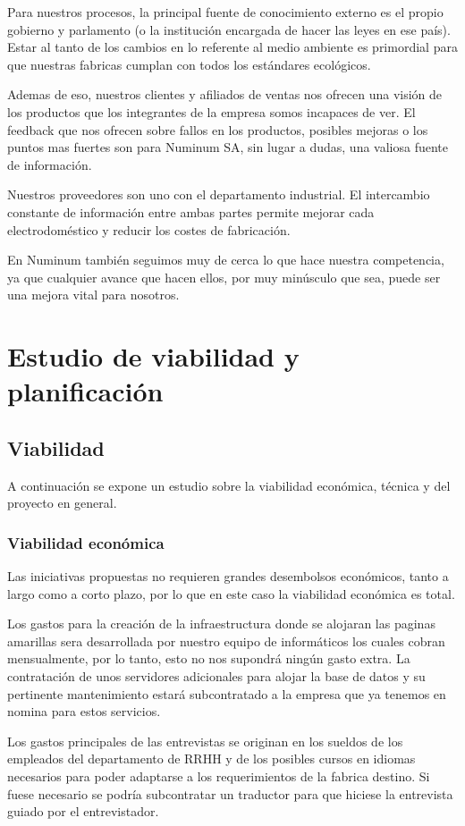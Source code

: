 \documentclass[twoside]{article}
\begin{document}
Para nuestros procesos, la principal fuente de conocimiento externo es el propio gobierno y parlamento (o la institución encargada de hacer las leyes en ese país). Estar al tanto de los cambios en lo referente al medio ambiente es primordial para que nuestras fabricas cumplan con todos los estándares ecológicos. \par
Ademas de eso, nuestros clientes y afiliados de ventas nos ofrecen una visión de los productos que los integrantes de la empresa somos incapaces de ver. El feedback que nos ofrecen sobre fallos en los productos, posibles mejoras o los puntos mas fuertes son para Numinum SA, sin lugar a dudas, una valiosa fuente de información.\par
Nuestros proveedores son uno con el departamento industrial. El intercambio constante de información entre ambas partes permite mejorar cada electrodoméstico y reducir los costes de fabricación.\par
En Numinum también seguimos muy de cerca lo que hace nuestra competencia, ya que cualquier avance que hacen ellos, por muy minúsculo que sea, puede ser una mejora vital para nosotros.


\section{Estudio de viabilidad y planificación}

\subsection{Viabilidad}

A continuación se expone un estudio sobre la viabilidad económica, técnica y del proyecto en general.

\subsubsection{Viabilidad económica}
Las iniciativas propuestas no requieren grandes desembolsos económicos, tanto a largo como a corto plazo, por lo que en este caso la viabilidad económica es total.\par
Los gastos para la creación de la infraestructura donde se alojaran las paginas amarillas sera desarrollada por nuestro equipo de informáticos los cuales cobran mensualmente, por lo tanto, esto no nos supondrá ningún gasto extra. La contratación de unos servidores adicionales para alojar la base de datos y su pertinente mantenimiento estará subcontratado a la empresa que ya tenemos en nomina para estos servicios.\par
Los gastos principales de las entrevistas se originan en los sueldos de los empleados del departamento de RRHH y de los posibles cursos en idiomas necesarios para poder adaptarse a los requerimientos de la fabrica destino. Si fuese necesario se podría subcontratar un traductor para que hiciese la entrevista guiado por el entrevistador.
\end{document}
